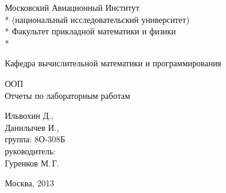 % 
% 

\begin{titlepage}

\newpage

\begin{center}
Московский Авиационный Институт \\*
(национальный исследовательский университет) \\*
Факультет прикладной математики и физики \\*
\hrulefill
\end{center}

\begin{center}
Кафедра вычислительной математики и программирования
\end{center}

\vspace{6em}

\begin{center}
\Large ООП \\
	Отчеты по лабораторным работам %
\end{center}

\vspace{2em}
\vspace{6em}

\begin{flushright}
	Ильвохин Д., \\
	Данилычев И., \\
	группа: 8О-308Б \\
\vspace{1em}
руководитель:\\
	Гуренков М.\,Г. \\
\end{flushright}

\vspace{\fill}

\begin{center}
Москва, 2013
\end{center}

\end{titlepage}

% 
